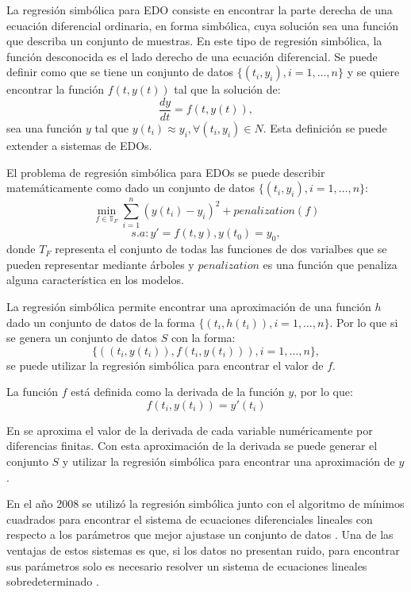 La regresión simbólica para EDO consiste en encontrar la parte derecha de una ecuación diferencial ordinaria, en forma simbólica, cuya solución sea una función que describa un conjunto de muestras. En este tipo de regresión simbólica, la función desconocida es el lado derecho de una ecuación diferencial. Se puede definir como que se tiene un conjunto de datos $\{(t_i, y_i), i = 1, \dots, n\}$ y se quiere encontrar la función $f(t, y(t))$ tal que la solución de:
\begin{equation*}
    \frac{dy}{dt} = f(t, y(t)),
\end{equation*}
sea una función $y$ tal que $y(t_i) \approx y_i, \forall(t_i, y_i) \in N$. Esta definición se puede extender a sistemas de EDOs.

El problema de regresión simbólica para EDOs se puede describir matemáticamente como dado un conjunto de datos $\{(t_i, y_i), i = 1, \dots, n\}$:
$$\min_{f\in\mathbb{T}_F} \sum_{i=1}^n (y(t_i) - y_i)^2 + penalization(f)$$
$$s.a: y' = f(t, y), y(t_0) = y_0,$$
donde $T_F$ representa el conjunto de todas las funciones de dos varialbes que se pueden representar mediante árboles y $penalization$ es una función que penaliza alguna característica en los modelos.

La regresión simbólica permite encontrar una aproximación de una función $h$ dado un conjunto de datos de la forma $\{(t_i, h(t_i)), i = 1, \dots, n\}$. Por lo que si se genera un conjunto de datos $S$ con la forma:
$$\{((t_i, y(t_i)), f(t_i, y(t_i))), i = 1, \dots, n\},$$
se puede utilizar la regresión simbólica para encontrar el valor de $f$.

La función $f$ está definida como la derivada de la función $y$, por lo que:
$$f(t_i, y(t_i)) = y'(t_i)$$

En \cite{gaucel2014learning, iba2008inference,kronberger2019identification} se aproxima el valor de la derivada de cada variable numéricamente por diferencias finitas. Con esta aproximación de la derivada se puede generar el conjunto $S$ y utilizar la regresión simbólica para encontrar una aproximación de $y$.

En el año 2008 se utilizó la regresión simbólica junto con el algoritmo de mínimos cuadrados para encontrar el sistema de ecuaciones diferenciales lineales con respecto a los parámetros que mejor ajustase un conjunto de datos \cite{iba2008inference}. Una de las ventajas de estos sistemas es que, si los datos no presentan ruido, para encontrar sus parámetros solo es necesario resolver un sistema de ecuaciones lineales sobredeterminado \cite{myers2012generalized}.

